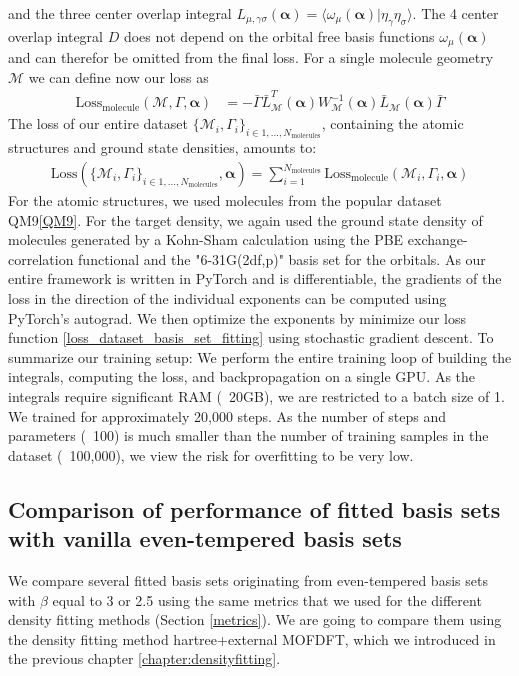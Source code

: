  and the three center overlap integral $L_{\mu,\gamma\sigma}(\mathbf{\alpha}) = \langle \omega_\mu(\mathbf{\alpha})|\eta_\gamma\eta_\sigma\rangle$. The 4 center overlap integral $D$ does not depend on the orbital free basis functions $\omega_\mu(\mathbf{\alpha})$ and can therefor be omitted from the final loss. For a single molecule geometry $\mathcal{M}$ we can define now our loss as
 \begin{align}\label{loss_basis_set_fitting}
    \text{Loss}_\text{molecule}(\mathcal{M}, \Gamma,\mathbf{\alpha}) & = - \bar \Gamma \bar L_{\mathcal{M}}^T(\mathbf{\alpha}) W_{\mathcal{M}}^{-1}(\mathbf{\alpha}) \bar L_{\mathcal{M}}(\mathbf{\alpha}) \bar \Gamma
 \end{align}
The loss of our entire dataset $\{\mathcal{M}_i,\Gamma_i\}_{i\in 1,...,N_{\text{molecules}}}$, containing the atomic structures and ground state densities, amounts to:
\begin{align} \label{loss_dataset_basis_set_fitting}
    \text{Loss}(\{\mathcal{M}_i,\Gamma_i\}_{i\in 1,...,N_{\text{molecules}}},\mathbf{\alpha}) = \sum\limits_{i=1}^{N_{\text{molecules}}} \text{Loss}_\text{molecule}(\mathcal{M}_i, \Gamma_i,\mathbf{\alpha})
\end{align}
For the atomic structures, we used molecules from the popular dataset QM9\ref{QM9}. For the target density, we again used the ground state density of molecules generated by a Kohn-Sham calculation using the PBE exchange-correlation functional and the "6-31G(2df,p)" basis set for the orbitals.
As our entire framework is written in PyTorch and is differentiable, the gradients of the loss in the direction of the individual exponents can be computed using PyTorch's autograd. We then optimize the exponents by minimize our loss function \eqref{loss_dataset_basis_set_fitting} using stochastic gradient descent.
To summarize our training setup:
We perform the entire training loop of building the integrals, computing the loss, and backpropagation on a single GPU. As the integrals require significant RAM (~20GB), we are restricted to a batch size of 1. We trained for approximately 20,000 steps. As the number of steps and parameters (~100) is much smaller than the number of training samples in the dataset (~100,000), we view the risk for overfitting to be very low.
\subsection{Comparison of performance of fitted basis sets with vanilla even-tempered basis sets}
We compare several fitted basis sets originating from even-tempered basis sets with $\beta$ equal to 3 or 2.5 using the same metrics that we used for the different density fitting methods (Section \ref{metrics}). We are going to compare them using the density fitting method hartree+external MOFDFT, which we introduced in the previous chapter \ref{chapter:densityfitting}.
